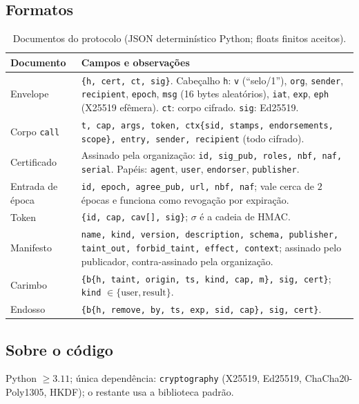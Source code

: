 \documentclass[11pt,a4paper]{article}
\theoremstyle{plain}
\theoremstyle{definition}
\theoremstyle{remark}
\newcommand{\cod}[1]{\texttt{#1}}
\begin{document}
\subsection{Formatos}

\begin{table}[h!]
\centering\small
\begin{tabular}{p{2.4cm}p{12.6cm}}
\toprule
\rowcolor{corCaixa}\textbf{Documento} & \textbf{Campos e observações} \\
\midrule
Envelope & \cod{\{h, cert, ct, sig\}}. Cabeçalho \cod{h}: \cod{v} (``selo/1''), \cod{org}, \cod{sender}, \cod{recipient}, \cod{epoch}, \cod{msg} (16 bytes aleatórios), \cod{iat}, \cod{exp}, \cod{eph} (X25519 efêmera). \cod{ct}: corpo cifrado. \cod{sig}: Ed25519. \\
Corpo \cod{call} & \cod{t, cap, args, token, ctx\{sid, stamps, endorsements, scope\}, entry, sender, recipient} (todo cifrado). \\
Certificado & Assinado pela organização: \cod{id, sig\_pub, roles, nbf, naf, serial}. Papéis: \cod{agent}, \cod{user}, \cod{endorser}, \cod{publisher}. \\
Entrada de época & \cod{id, epoch, agree\_pub, url, nbf, naf}; vale cerca de $2$ épocas e funciona como revogação por expiração. \\
Token & \cod{\{id, cap, cav[], sig\}}; $\sigma$ é a cadeia de HMAC. \\
Manifesto & \cod{name, kind, version, description, schema, publisher, taint\_out, forbid\_taint, effect, context}; assinado pelo publicador, contra-assinado pela organização. \\
Carimbo & \cod{\{b\{h, taint, origin, ts, kind, cap, m\}, sig, cert\}}; \cod{kind} $\in\{\text{user},\text{result}\}$. \\
Endosso & \cod{\{b\{h, remove, by, ts, exp, sid, cap\}, sig, cert\}}. \\
\bottomrule
\end{tabular}
\caption{Documentos do protocolo (JSON determinístico Python; floats finitos aceitos).}
\end{table}

\subsection{Sobre o código}

Python $\ge 3.11$; única dependência: \cod{cryptography} (X25519, Ed25519, ChaCha20-Poly1305, HKDF); o restante usa a biblioteca padrão.
\end{document}

